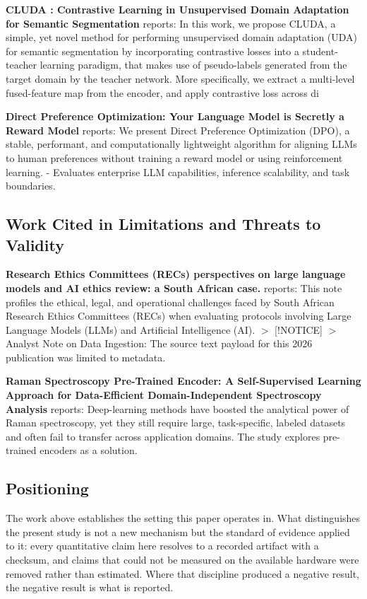 \documentclass[10pt,twocolumn,letterpaper]{article}
\begin{document}
\textbf{CLUDA : Contrastive Learning in Unsupervised Domain Adaptation for Semantic Segmentation} \cite{arxiv_2208_14227} reports: In this work, we propose CLUDA, a simple, yet novel method for performing unsupervised domain adaptation (UDA) for semantic segmentation by incorporating contrastive losses into a student-teacher learning paradigm, that makes use of pseudo-labels generated from the target domain by the teacher network. More specifically, we extract a multi-level fused-feature map from the encoder, and apply contrastive loss across di

\textbf{Direct Preference Optimization: Your Language Model is Secretly a Reward Model} \cite{arxiv_2305_18290} reports: We present Direct Preference Optimization (DPO), a stable, performant, and computationally lightweight algorithm for aligning LLMs to human preferences without training a reward model or using reinforcement learning. - Evaluates enterprise LLM capabilities, inference scalability, and task boundaries.


\subsection{Work Cited in Limitations and Threats to Validity}


\textbf{Research Ethics Committees (RECs) perspectives on large language models and AI ethics review: a South African case.} \cite{pubmed_42380865} reports: This note profiles the ethical, legal, and operational challenges faced by South African Research Ethics Committees (RECs) when evaluating protocols involving Large Language Models (LLMs) and Artificial Intelligence (AI). $>$ [!NOTICE] $>$ Analyst Note on Data Ingestion: The source text payload for this 2026 publication was limited to metadata.

\textbf{Raman Spectroscopy Pre-Trained Encoder: A Self-Supervised Learning Approach for Data-Efficient Domain-Independent Spectroscopy Analysis} \cite{doaj_001772c2113c476d9d5d40452c8e10e1} reports: Deep-learning methods have boosted the analytical power of Raman spectroscopy, yet they still require large, task-specific, labeled datasets and often fail to transfer across application domains. The study explores pre-trained encoders as a solution.


\subsection{Positioning}


The work above establishes the setting this paper operates in. What distinguishes the present study is not a new mechanism but the standard of evidence applied to it: every quantitative claim here resolves to a recorded artifact with a checksum, and claims that could not be measured on the available hardware were removed rather than estimated. Where that discipline produced a negative result, the negative result is what is reported.
\end{document}
